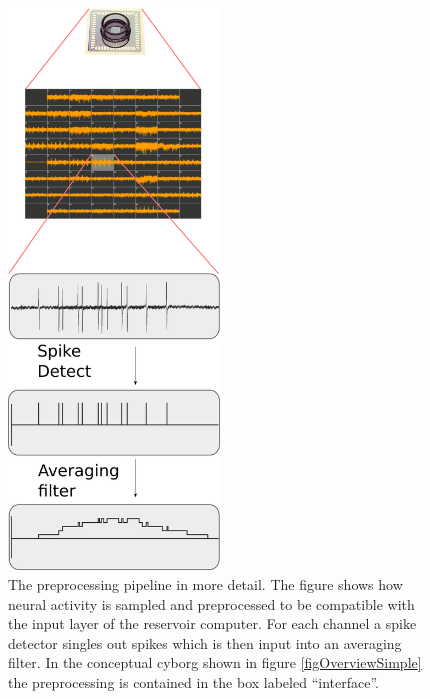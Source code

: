 \begin{figure}[h!]
  \centering
  \includegraphics[width=0.5\textwidth]{fig/system4.png}
  \caption[Preprocessing of neural data]{
    The preprocessing pipeline in more detail.
    The figure shows how neural activity is sampled and preprocessed to
    be compatible with the input layer of the reservoir computer.
    For each channel a spike detector singles out spikes which is then input
    into an averaging filter.
    In the conceptual cyborg shown in figure \ref{figOverviewSimple} the
    preprocessing is contained in the box labeled ``interface''.
  }
  \label{figWaves}
\end{figure}

